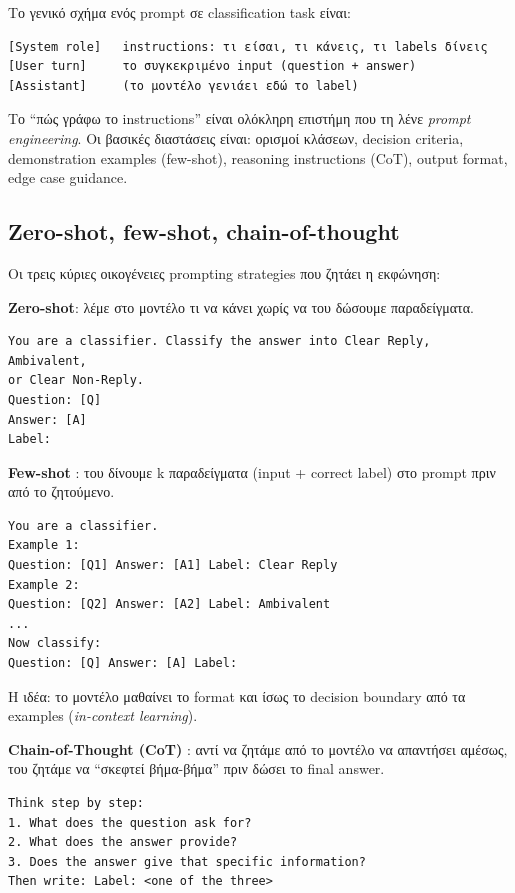 \documentclass[12pt]{fphw}
\begin{document}
Το γενικό σχήμα ενός prompt σε classification task είναι:

\begin{verbatim}
[System role]   instructions: τι είσαι, τι κάνεις, τι labels δίνεις
[User turn]     το συγκεκριμένο input (question + answer)
[Assistant]     (το μοντέλο γενιάει εδώ το label)
\end{verbatim}

Το ``πώς γράφω το instructions'' είναι ολόκληρη επιστήμη που τη λένε \emph{prompt engineering}. Οι βασικές διαστάσεις είναι: ορισμοί κλάσεων, decision criteria, demonstration examples (few-shot), reasoning instructions (CoT), output format, edge case guidance.

\subsection{Zero-shot, few-shot, chain-of-thought}

Οι τρεις κύριες οικογένειες prompting strategies που ζητάει η εκφώνηση:

\textbf{Zero-shot}: λέμε στο μοντέλο τι να κάνει χωρίς να του δώσουμε παραδείγματα.

\begin{verbatim}
You are a classifier. Classify the answer into Clear Reply, Ambivalent,
or Clear Non-Reply.
Question: [Q]
Answer: [A]
Label:
\end{verbatim}

\textbf{Few-shot} \cite{brown2020gpt3}: του δίνουμε k παραδείγματα (input + correct label) στο prompt πριν από το ζητούμενο.

\begin{verbatim}
You are a classifier.
Example 1:
Question: [Q1] Answer: [A1] Label: Clear Reply
Example 2:
Question: [Q2] Answer: [A2] Label: Ambivalent
...
Now classify:
Question: [Q] Answer: [A] Label:
\end{verbatim}

Η ιδέα: το μοντέλο μαθαίνει το format και ίσως το decision boundary από τα examples (\emph{in-context learning}).

\textbf{Chain-of-Thought (CoT)} \cite{wei2022cot}: αντί να ζητάμε από το μοντέλο να απαντήσει αμέσως, του ζητάμε να ``σκεφτεί βήμα-βήμα'' πριν δώσει το final answer.

\begin{verbatim}
Think step by step:
1. What does the question ask for?
2. What does the answer provide?
3. Does the answer give that specific information?
Then write: Label: <one of the three>
\end{verbatim}
\end{document}

